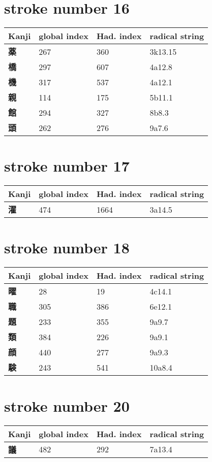 \section{stroke number 16}
  \begin{longtable}[c]{llll}
    \bfseries Kanji & \bfseries global index & \bfseries Had. index & \bfseries radical string\\\hline\endhead
    \bfseries 薬 & 267 & 360 & 3k13.15\\
    \bfseries 橋 & 297 & 607 & 4a12.8\\
    \bfseries 機 & 317 & 537 & 4a12.1\\
    \bfseries 親 & 114 & 175 & 5b11.1\\
    \bfseries 館 & 294 & 327 & 8b8.3\\
    \bfseries 頭 & 262 & 276 & 9a7.6\\
  \end{longtable}
\section{stroke number 17}
  \begin{longtable}[c]{llll}
    \bfseries Kanji & \bfseries global index & \bfseries Had. index & \bfseries radical string\\\hline\endhead
    \bfseries 濯 & 474 & 1664 & 3a14.5\\
  \end{longtable}
\section{stroke number 18}
  \begin{longtable}[c]{llll}
    \bfseries Kanji & \bfseries global index & \bfseries Had. index & \bfseries radical string\\\hline\endhead
    \bfseries 曜 & 28 & 19 & 4c14.1\\
    \bfseries 職 & 305 & 386 & 6e12.1\\
    \bfseries 題 & 233 & 355 & 9a9.7\\
    \bfseries 類 & 384 & 226 & 9a9.1\\
    \bfseries 顔 & 440 & 277 & 9a9.3\\
    \bfseries 験 & 243 & 541 & 10a8.4\\
  \end{longtable}
\section{stroke number 20}
  \begin{longtable}[c]{llll}
    \bfseries Kanji & \bfseries global index & \bfseries Had. index & \bfseries radical string\\\hline\endhead
    \bfseries 議 & 482 & 292 & 7a13.4\\
  \end{longtable}
